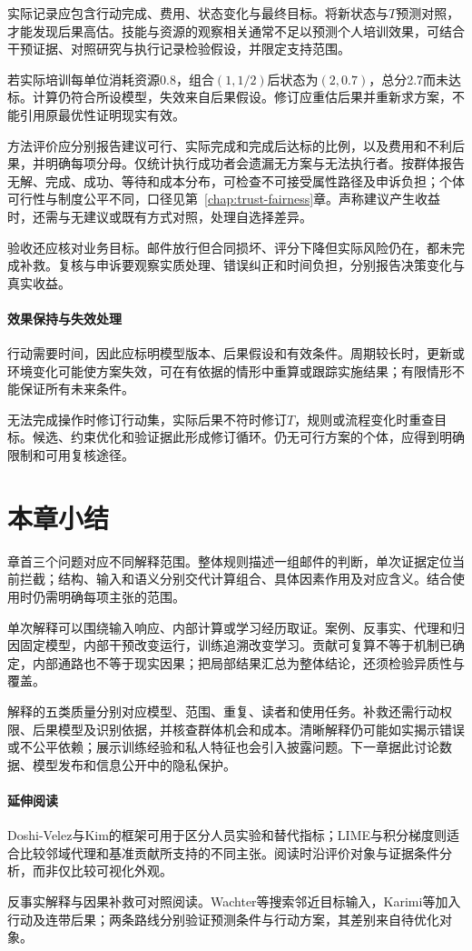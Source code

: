 实际记录应包含行动完成、费用、状态变化与最终目标。将新状态与$T$预测对照，才能发现后果高估。技能与资源的观察相关通常不足以预测个人培训效果，可结合干预证据、对照研究与执行记录检验假设，并限定支持范围。

若实际培训每单位消耗资源0.8，组合$(1,1/2)$后状态为$(2,0.7)$，总分2.7而未达标。计算仍符合所设模型，失效来自后果假设。修订应重估后果并重新求方案，不能引用原最优性证明现实有效。

方法评价应分别报告建议可行、实际完成和完成后达标的比例，以及费用和不利后果，并明确每项分母。仅统计执行成功者会遗漏无方案与无法执行者。按群体报告无解、完成、成功、等待和成本分布，可检查不可接受属性路径及申诉负担；个体可行性与制度公平不同，口径见第~\ref{chap:trust-fairness}章。声称建议产生收益时，还需与无建议或既有方式对照，处理自选择差异。

验收还应核对业务目标。邮件放行但合同损坏、评分下降但实际风险仍在，都未完成补救。复核与申诉要观察实质处理、错误纠正和时间负担，分别报告决策变化与真实收益。

\paragraph{效果保持与失效处理}

行动需要时间，因此应标明模型版本、后果假设和有效条件。周期较长时，更新或环境变化可能使方案失效，可在有依据的情形中重算或跟踪实施结果；有限情形不能保证所有未来条件。

无法完成操作时修订行动集，实际后果不符时修订$T$，规则或流程变化时重查目标。候选、约束优化和验证据此形成修订循环。仍无可行方案的个体，应得到明确限制和可用复核途径。

\section{本章小结}
\label{sec:interpretability-summary}

章首三个问题对应不同解释范围。整体规则描述一组邮件的判断，单次证据定位当前拦截；结构、输入和语义分别交代计算组合、具体因素作用及对应含义。结合使用时仍需明确每项主张的范围。

单次解释可以围绕输入响应、内部计算或学习经历取证。案例、反事实、代理和归因固定模型，内部干预改变运行，训练追溯改变学习。贡献可复算不等于机制已确定，内部通路也不等于现实因果；把局部结果汇总为整体结论，还须检验异质性与覆盖。

解释的五类质量分别对应模型、范围、重复、读者和使用任务。补救还需行动权限、后果模型及识别依据，并核查群体机会和成本。清晰解释仍可能如实揭示错误或不公平依赖；展示训练经验和私人特征也会引入披露问题。下一章据此讨论数据、模型发布和信息公开中的隐私保护。

\paragraph{延伸阅读}

Doshi-Velez与Kim的框架可用于区分人员实验和替代指标；LIME与积分梯度则适合比较邻域代理和基准贡献所支持的不同主张。阅读时沿评价对象与证据条件分析，而非仅比较可视化外观。

反事实解释与因果补救可对照阅读。Wachter等搜索邻近目标输入，Karimi等加入行动及连带后果；两条路线分别验证预测条件与行动方案，其差别来自待优化对象。